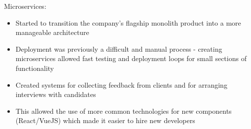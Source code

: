 \item Microservices:
\begin{itemize}%
    \item Started to transition the company's flagship monolith product into a more manageable architecture
    \item Deployment was previously a difficult and manual process - creating microservices allowed fast testing and deployment loops for small sections of functionality
    \item Created systems for collecting feedback from clients and for arranging interviews with candidates
    \item This allowed the use of more common technologies for new components (React/VueJS) which made it easier to hire new developers
\end{itemize}
